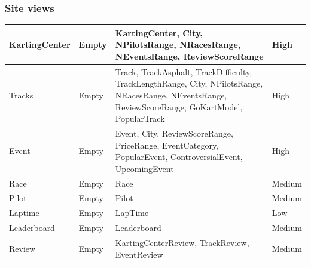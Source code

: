 \documentclass{beamer}
\begin{document}
\begin{frame}
    \frametitle{Site views}
    \begin{table}
        \centering
        \tiny
        \setlength{\tabcolsep}{1pt}
        \begin{tabular}{|m{2cm}|m{4cm}|m{3cm}|m{1cm}|}
        \hline
        KartingCenter & Empty & KartingCenter, City, NPilotsRange, NRacesRange, NEventsRange, ReviewScoreRange & High \\
        \hline
        Tracks & Empty & Track, TrackAsphalt, TrackDifficulty, TrackLengthRange, City, NPilotsRange, NRacesRange, NEventsRange, ReviewScoreRange,
        GoKartModel, PopularTrack & High \\
        \hline
        Event & Empty & Event, City, ReviewScoreRange, PriceRange, EventCategory, PopularEvent, ControversialEvent, 
        UpcomingEvent & High \\
        \hline
        Race & Empty & Race & Medium \\
        \hline
        Pilot & Empty & Pilot & Medium \\
        \hline
        Laptime & Empty & LapTime & Low \\
        \hline
        Leaderboard & Empty & Leaderboard & Medium \\
        \hline
        Review & Empty & KartingCenterReview, TrackReview, EventReview & Medium \\
        \hline
        \end{tabular}
    \end{table}
\end{frame}
\end{document}
